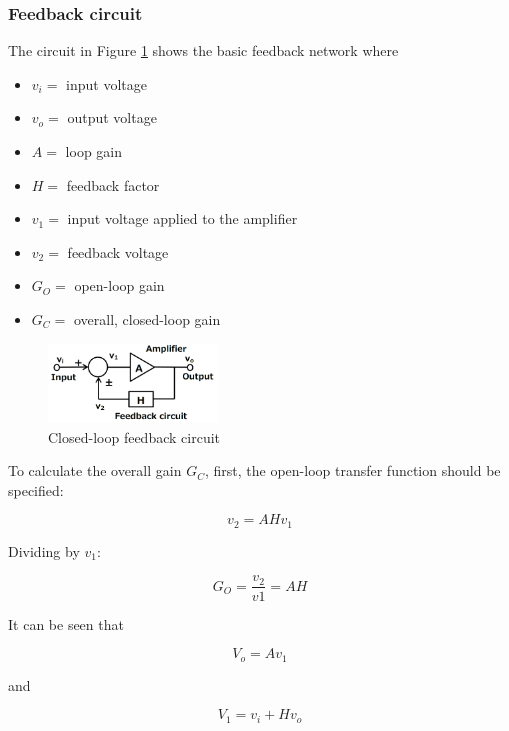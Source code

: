 \subsubsection{Feedback circuit}
\label{sec:feedback_circuit}

The circuit in Figure \ref{fig:feedback_cl} shows the basic feedback network where

\begin{itemize}
    \item $v_i = $ input voltage
    \item $v_o = $ output voltage
    \item $A = $ loop gain
    \item $H = $ feedback factor
    \item $v_1 = $ input voltage applied to the amplifier
    \item $v_2 = $ feedback voltage
    \item $G_O = $ open-loop gain
    \item $G_C = $ overall, closed-loop gain
\end{itemize}

\begin{figure}[H]
	\centering
	\includegraphics[width=0.4\textwidth]{pictures/theory/feedback_cl.png}
	\caption{Closed-loop feedback circuit}
	\label{fig:feedback_cl}
\end{figure}

To calculate the overall gain $G_C$, first, the open-loop transfer function should be specified:

\begin{equation}
    v_2 = AHv_1
\end{equation}

Dividing by $v_1$:

\begin{equation}
    G_O = \frac{v_2}{v1} = AH
\end{equation}

It can be seen that

\begin{equation}
    V_o = Av_1
\end{equation}

and

\begin{equation}
    V_1 = v_i + Hv_o
\end{equation}

